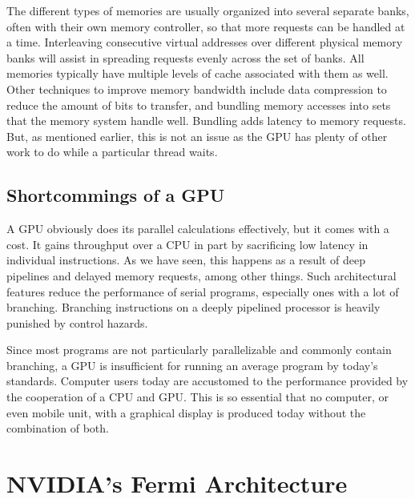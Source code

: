 \documentclass[../main/report.tex]{subfiles}
\begin{document}
The different types of memories are usually organized into several separate banks, often with their own memory controller, so that more requests can be handled at a time.
Interleaving consecutive virtual addresses over different physical memory banks will assist in spreading requests evenly across the set of banks. 
All memories typically have multiple levels of cache associated with them as well.
Other techniques to improve memory bandwidth include data compression to reduce the amount of bits to transfer, and bundling memory accesses into sets that the memory system handle well.
Bundling adds latency to memory requests.
But, as mentioned earlier, this is not an issue as the GPU has plenty of other work to do while a particular thread waits.

\section{Shortcommings of a GPU}


A GPU obviously does its parallel calculations effectively, but it comes with a cost.
It gains throughput over a CPU in part by sacrificing low latency in individual instructions.
As we have seen, this happens as a result of deep pipelines and delayed memory requests, among other things.
Such architectural features reduce the performance of serial programs, especially ones with a lot of branching.
Branching instructions on a deeply pipelined processor is heavily punished by control hazards.

Since most programs are not particularly parallelizable and commonly contain branching, a GPU is insufficient for running an average program by today's standards.
Computer users today are accustomed to the performance provided by the cooperation of a CPU and GPU.
This is so essential that no computer, or even mobile unit, with a graphical display is produced today without the combination of both.

\chapter{NVIDIA's Fermi Architecture}
\label{sec:fermi}

\end{document}
